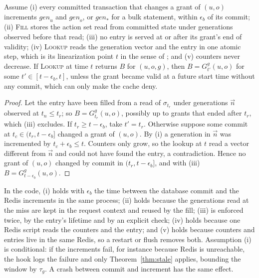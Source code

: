 \begin{proposition}\label{prop:fresh}
Assume (i) every committed transaction that changes a grant of $(u,o)$ increments $\mathit{gen}_u$ and
$\mathit{gen}_o$, or $\mathit{gen}_\ast$ for a bulk statement, within $\epsilon_b$ of its commit; (ii)
\textsc{Fill} stores the action set read from committed state under generations observed before that read;
(iii) no entry is served at or after its grant's end of validity; (iv) \textsc{Lookup} reads the generation vector
and the entry in one atomic step, which is its linearization point $t$ in the sense of
\cite{herlihy1990linearizability}; and (v) counters never decrease. If \textsc{Lookup} at time $t$ returns $B$ for
$(u,o,g)$, then $B=G^g_{t'}(u,o)$ for some $t'\in[t-\epsilon_b,t]$, unless the grant became valid at a future
start time without any commit, which can only make the cache deny.
\end{proposition}
\begin{proof}
Let the entry have been filled from a read of $\sigma_{t_r}$ under generations $\vec{n}$ observed at
$t_n\le t_r$; so $B=G^g_{t_r}(u,o)$, possibly up to grants that ended after $t_r$, which (iii) excludes. If
$t_r\ge t-\epsilon_b$, take $t'=t_r$. Otherwise suppose some commit at $t_c\in(t_r,t-\epsilon_b]$ changed a grant
of $(u,o)$. By (i) a generation in $\vec{n}$ was incremented by $t_c+\epsilon_b\le t$. Counters only grow, so the
lookup at $t$ read a vector different from $\vec{n}$ and could not have found the entry, a contradiction. Hence
no grant of $(u,o)$ changed by commit in $(t_r,t-\epsilon_b]$, and with (iii) $B=G^g_{t-\epsilon_b}(u,o)$.
\end{proof}

In the code, (i) holds with $\epsilon_b$ the time between the database commit and the Redis increments in the
same process; (ii) holds because the generations read at the miss are kept in the request context and reused
by the fill; (iii) is enforced twice, by the entry's lifetime and by an explicit check; (iv) holds because one Redis
script reads the counters and the entry; and (v) holds because counters and entries live in the same Redis, so a
restart or flush removes both. Assumption (i) is conditional: if the increments fail, for instance because Redis
is unreachable, the hook logs the failure and only Theorem~\ref{thm:stale} applies, bounding the window by
$\tau_g$. A crash between commit and increment has the same effect.


